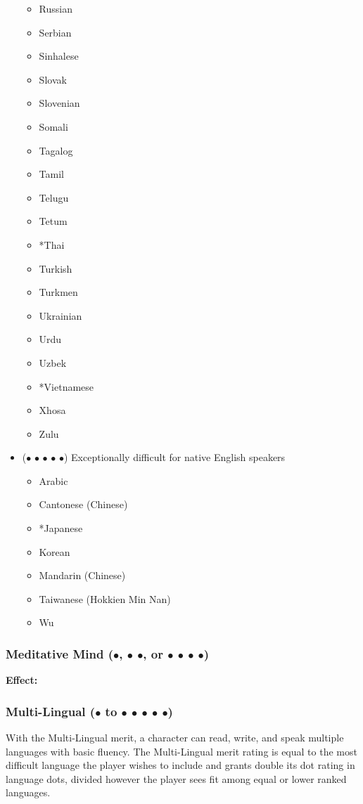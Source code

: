 \documentclass["../Misguided by Starlight.tex"]{subfiles}
\begin{document}
\begin{itemize}
\begin{itemize}
				\item Russian
				\item Serbian
				\item Sinhalese
				\item Slovak
				\item Slovenian
				\item Somali
				\item Tagalog
				\item Tamil
				\item Telugu
				\item Tetum
				\item *Thai
				\item Turkish
				\item Turkmen
				\item Ukrainian
				\item Urdu
				\item Uzbek
				\item *Vietnamese
				\item Xhosa
				\item Zulu
			\end{itemize}

			\item ($\bullet$ $\bullet$ $\bullet$ $\bullet$ $\bullet$) Exceptionally difficult for native English speakers
			\begin{itemize}
				\item Arabic
				\item Cantonese (Chinese)
				\item *Japanese
				\item Korean
				\item Mandarin (Chinese)
				\item Taiwanese (Hokkien Min Nan)
				\item Wu
			\end{itemize}
		\end{itemize}
	
	\subsubsection{Meditative Mind ($\bullet$, $\bullet$ $\bullet$, or $\bullet$ $\bullet$ $\bullet$ $\bullet$)} %
		\textbf{Effect:} 
	
	\subsubsection{Multi-Lingual ($\bullet$ to $\bullet$ $\bullet$ $\bullet$ $\bullet$ $\bullet$)} %
		With the Multi-Lingual merit, a character can read, write, and speak multiple languages with basic fluency. The Multi-Lingual merit rating is equal to the most difficult language the player wishes to include and grants double its dot rating in language dots, divided however the player sees fit among equal or lower ranked languages.
		
\end{document}
